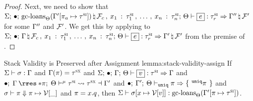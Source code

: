 \begin{proof}
  Next, we need to show that
  $\oxtypjudge{\oxglobalctx}{\oxemptyctx}{\oxkontctx}{
    \oxnewframe{
      \oxgcloans{\oxkontctx}{\oxtupdate{\oxvarctx^\prime}{\oxplace_a}{\oxsitype}}
    }{
      \oxframe_c \oxcomma
      \oxvarctxentry{\oxid_1}{\oxsitype_1} \oxdotsc
      \oxvarctxentry{\oxid_n}{\oxsitype_n}
    }
  }{\oxexpr}{\oxsitype_\oxcprov}{\oxnewframe{\oxvarctx^{\prime\prime}}{\oxframe^\prime}}$
  for some $\Gamma^{\prime\prime}$ and $\mathcal{F}^\prime$. We get this by
  applying  to
  $\oxtypjudge{\oxglobalctx}{\oxemptyctx}{\oxkontctx}{
    \oxnewframe{\oxvarctx}{
      \oxframe_c \oxcomma
      \oxvarctxentry{\oxid_1}{\oxsitype_1} \oxdotsc
      \oxvarctxentry{\oxid_n}{\oxsitype_n}
    }
  }{\oxexpr}{\oxsitype_\oxcprov}{\oxnewframe{\oxvarctx^\prime}{\oxframe^\prime}}$
  from the premise of .
\end{proof}

\begin{oxlemma}{Stack Validity is Preserved after Assignment}
  {lemma:stack-validity-assign}
  If $\Sigma \vdash \sigma : \Gamma$ and
  $\Gamma(\pi) = \tau^\textsc{sx}$ and
  $\oxtypjudge{\oxglobalctx}{\oxemptyctx}{\oxkontctx}{\oxvarctx}{
    \oxvalue
  }{\oxsitype}{\oxvarctx}$ and
  $\oxtunify{\oxemptyctx}{\oxkontctx}{
    \oxrsub{\oxvarctx}{\oxderef{\oxplace}}
  }{\oxsitype}{\oxsxtype}{\oxvarctx^\prime}$ and
  $\bullet; \: \Gamma^\prime; \: \Theta \vdash_{\mathtt{uniq}} \pi \Rightarrow 
    \{ \: \,^{\mathtt{uniq}}\pi\, \: \}
  $ and
  $ \sigma \vdash \pi \Downarrow \pi \mapsto \mathcal{V} [\_] $ and
  $\pi = x . q$,
  then
  $\Sigma \vdash 
    \sigma [x \mapsto \mathcal{V}[v]]
   : 
    \textrm{gc-loans}_{\Theta}(\Gamma^\prime [\pi \mapsto \tau^\textsc{si}])
  $.
\end{oxlemma}

